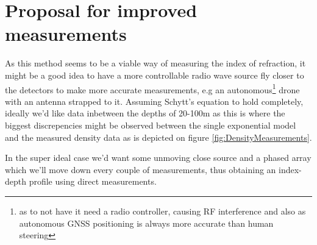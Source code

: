 \chapter*{Proposal for improved measurements}
As this method seems to be a viable way of measuring the index of refraction,
it might be a good idea to have a more controllable radio wave source fly
closer to the detectors to make more accurate measurements, e.g an
autonomous\footnote{as to not have it need a radio controller, causing RF
interference and also as autonomous GNSS positioning is always more
accurate than human steering} drone with an antenna strapped to it.  Assuming Schytt's
equation to hold completely, ideally we'd like data inbetween the depths of
20-100m as this is where the biggest discrepencies might be observed between
the single exponential model and the measured density data as is depicted on
figure \ref{fig:DensityMeasurements}. 

In the super ideal case we'd want some unmoving close source and a phased array which we'll
move down every couple of measurements, thus obtaining an index-depth profile
using direct measurements.

